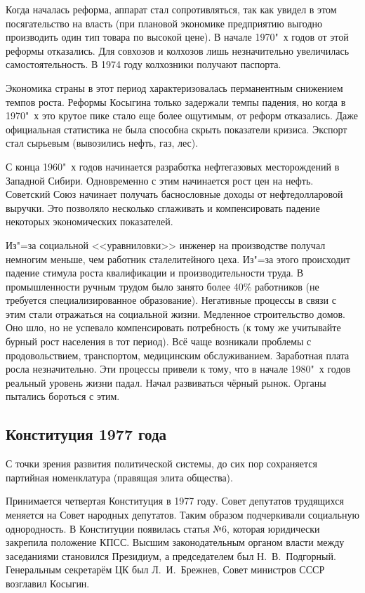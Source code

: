 Когда началась реформа, аппарат стал сопротивляться, так как увидел в этом посягательство на власть (при плановой экономике предприятию выгодно производить один тип товара по высокой цене). В начале 1970"~х годов от этой реформы отказались. Для совхозов и колхозов лишь незначительно увеличилась самостоятельность. В 1974 году колхозники получают паспорта.

Экономика страны в этот период характеризовалась перманентным снижением темпов роста. Реформы Косыгина только задержали темпы падения, но когда в 1970"~х это крутое пике стало еще более ощутимым, от реформ отказались. Даже официальная статистика не была способна скрыть показатели кризиса. Экспорт стал сырьевым (вывозились нефть, газ, лес). 

С конца 1960"~х годов начинается разработка нефтегазовых месторождений в Западной Сибири. Одновременно с этим начинается рост цен на нефть. Советский Союз начинает получать баснословные доходы от нефтедолларовой выручки. Это позволяло несколько сглаживать и компенсировать падение некоторых экономических показателей.

 Из"=за социальной <<уравниловки>> инженер на производстве получал немногим меньше, чем работник сталелитейного цеха. Из"=за этого происходит падение стимула роста квалификации и производительности труда. В промышленности ручным трудом было занято более 40\% работников (не требуется специализированное образование). Негативные процессы в связи с этим стали отражаться на социальной жизни. Медленное строительство домов. Оно шло, но не успевало компенсировать потребность (к тому же учитывайте бурный рост населения в тот период). Всё чаще возникали проблемы с продовольствием, транспортом, медицинским обслуживанием. Заработная плата росла незначительно. Эти процессы привели к тому, что в начале 1980"~х годов реальный уровень жизни падал. Начал развиваться чёрный рынок. Органы пытались бороться с этим. 


\subsection{Конституция 1977 года}

С точки зрения развития политической системы, до сих пор сохраняется партийная номенклатура (правящая элита общества). 

Принимается четвертая Конституция в 1977 году. Совет депутатов трудящихся меняется на Совет народных депутатов. Таким образом подчеркивали социальную однородность. В Конституции появилась статья №6, которая юридически закрепила положение КПСС. Высшим законодательным органом власти между заседаниями становился Президиум, а председателем был Н.~В.~Подгорный. Генеральным секретарём ЦК был Л.~И.~Брежнев, Совет министров СССР возглавил Косыгин.

